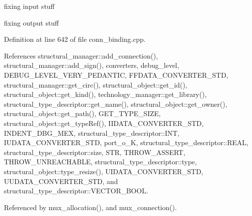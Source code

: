 fixing input stuff

fixing output stuff 

Definition at line 642 of file conn\+\_\+binding.\+cpp.



References structural\+\_\+manager\+::add\+\_\+connection(), structural\+\_\+manager\+::add\+\_\+sign(), converters, debug\+\_\+level, D\+E\+B\+U\+G\+\_\+\+L\+E\+V\+E\+L\+\_\+\+V\+E\+R\+Y\+\_\+\+P\+E\+D\+A\+N\+T\+IC, F\+F\+D\+A\+T\+A\+\_\+\+C\+O\+N\+V\+E\+R\+T\+E\+R\+\_\+\+S\+TD, structural\+\_\+manager\+::get\+\_\+circ(), structural\+\_\+object\+::get\+\_\+id(), structural\+\_\+object\+::get\+\_\+kind(), technology\+\_\+manager\+::get\+\_\+library(), structural\+\_\+type\+\_\+descriptor\+::get\+\_\+name(), structural\+\_\+object\+::get\+\_\+owner(), structural\+\_\+object\+::get\+\_\+path(), G\+E\+T\+\_\+\+T\+Y\+P\+E\+\_\+\+S\+I\+ZE, structural\+\_\+object\+::get\+\_\+type\+Ref(), I\+I\+D\+A\+T\+A\+\_\+\+C\+O\+N\+V\+E\+R\+T\+E\+R\+\_\+\+S\+TD, I\+N\+D\+E\+N\+T\+\_\+\+D\+B\+G\+\_\+\+M\+EX, structural\+\_\+type\+\_\+descriptor\+::\+I\+NT, I\+U\+D\+A\+T\+A\+\_\+\+C\+O\+N\+V\+E\+R\+T\+E\+R\+\_\+\+S\+TD, port\+\_\+o\+\_\+K, structural\+\_\+type\+\_\+descriptor\+::\+R\+E\+AL, structural\+\_\+type\+\_\+descriptor\+::size, S\+TR, T\+H\+R\+O\+W\+\_\+\+A\+S\+S\+E\+RT, T\+H\+R\+O\+W\+\_\+\+U\+N\+R\+E\+A\+C\+H\+A\+B\+LE, structural\+\_\+type\+\_\+descriptor\+::type, structural\+\_\+object\+::type\+\_\+resize(), U\+I\+D\+A\+T\+A\+\_\+\+C\+O\+N\+V\+E\+R\+T\+E\+R\+\_\+\+S\+TD, U\+U\+D\+A\+T\+A\+\_\+\+C\+O\+N\+V\+E\+R\+T\+E\+R\+\_\+\+S\+TD, and structural\+\_\+type\+\_\+descriptor\+::\+V\+E\+C\+T\+O\+R\+\_\+\+B\+O\+OL.



Referenced by mux\+\_\+allocation(), and mux\+\_\+connection().

